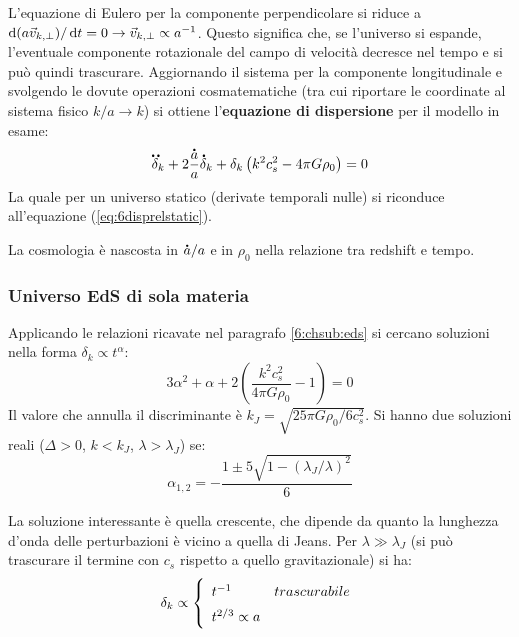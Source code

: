 L'equazione di Eulero per la componente perpendicolare si riduce a $\operatorname{d}\!{( a\vec{v}_{k,\perp})}/\operatorname{d}\!{t}=0 \rightarrow \vec{v}_{k,\perp}\propto a^{-1}$. Questo significa che, se l'universo si espande, l'eventuale componente rotazionale del campo di velocità decresce nel tempo e si può quindi trascurare.
Aggiornando il sistema per la componente longitudinale e svolgendo le dovute operazioni cosmatematiche (tra cui riportare le coordinate al sistema fisico $k/a\rightarrow k$) si ottiene l'\textbf{equazione di dispersione} per il modello in esame:
\begin{equation}
    \accentset{\mbox{\large\bfseries ..}}{\delta}_k + 2 \frac{\accentset{\mbox{\large\bfseries .}}{a}}{a}\accentset{\mbox{\large\bfseries .}}{\delta}_k + \delta_k \left( k^2 c_s^2 -4\pi G \rho_0\right) =0 \label{eq:6disprelmat}
\end{equation}
La quale per un universo statico (derivate temporali nulle) si riconduce all'equazione (\ref{eq:6disprelstatic}).

La cosmologia è nascosta in $\accentset{\mbox{\large\bfseries .}}{a}/a$ e in $\rho_0$ nella relazione tra redshift e tempo.


\subsubsection{Universo EdS di sola materia}
Applicando le relazioni ricavate nel paragrafo \ref{6:chsub:eds} si cercano soluzioni nella forma $\delta_k \propto t^\alpha$:
\begin{equation*}
3\alpha^2 + \alpha + 2\left( \frac{k^2 c_s^2}{4\pi G \rho_0}-1\right)=0
\end{equation*}
Il valore che annulla il discriminante è $k_J= \sqrt{25\pi G \rho_0 /6c_s^2}$. Si hanno due soluzioni reali ($\Delta >0$, $k<k_J$, $\lambda >\lambda_J$) se:
\begin{equation*}
\alpha_{1,2}=-\frac{1\pm 5\sqrt{1-\left( \lambda_J /\lambda\right)^2}}{6}
\end{equation*}

La soluzione interessante è quella crescente, che dipende da quanto la lunghezza d'onda delle perturbazioni è vicino a quella di Jeans.
Per $\lambda \gg \lambda_J$ (si può trascurare il termine con $c_s$ rispetto a quello gravitazionale) si ha:
\begin{equation}\delta_k \propto  \left\{
    \def\arraystretch{1.5}
        \begin{array}{ll}
            t^{-1} & trascurabile \\
            t^{2/3} \propto a & 
    \end{array}\right. 
\end{equation}

